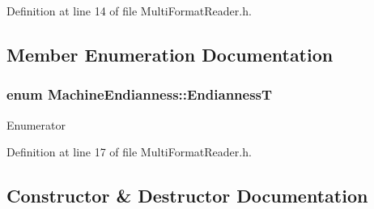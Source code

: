 Definition at line 14 of file Multi\+Format\+Reader.\+h.



\subsection{Member Enumeration Documentation}
\subsubsection[{\texorpdfstring{EndiannessT}{EndiannessT}}]{\setlength{\rightskip}{0pt plus 5cm}enum {\bf Machine\+Endianness\+::\+EndiannessT}}\hypertarget{class_machine_endianness_a1d179c9c1da7949f5670f5654e0be09b}{}\label{class_machine_endianness_a1d179c9c1da7949f5670f5654e0be09b}
\begin{Desc}
\item[Enumerator]\par
\begin{description}
\item[{\em 
Little\hypertarget{class_machine_endianness_a1d179c9c1da7949f5670f5654e0be09ba63849a8f1aad67b2313babb52a87922a}{}\label{class_machine_endianness_a1d179c9c1da7949f5670f5654e0be09ba63849a8f1aad67b2313babb52a87922a}
}]\item[{\em 
Big\hypertarget{class_machine_endianness_a1d179c9c1da7949f5670f5654e0be09ba08091e348453df47a2cb4be13cb3d3f4}{}\label{class_machine_endianness_a1d179c9c1da7949f5670f5654e0be09ba08091e348453df47a2cb4be13cb3d3f4}
}]\end{description}
\end{Desc}


Definition at line 17 of file Multi\+Format\+Reader.\+h.



\subsection{Constructor \& Destructor Documentation}
